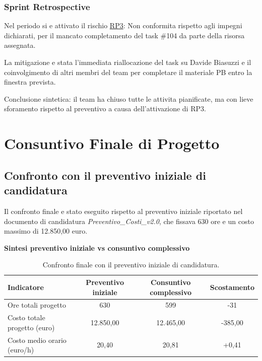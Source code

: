 \documentclass[a4paper, 11pt, oneside]{scrartcl} %
\begin{document}
\subsubsection*{Sprint Retrospective}

Nel periodo si e attivato il rischio \hyperref[sec:rp3]{RP3}: Non conformita rispetto agli impegni dichiarati, per il mancato completamento del task \#104 da parte della risorsa assegnata.

La mitigazione e stata l'immediata riallocazione del task su Davide Biasuzzi e il coinvolgimento di altri membri del team per completare il materiale PB entro la finestra prevista.

Conclusione sintetica: il team ha chiuso tutte le attivita pianificate, ma con lieve sforamento rispetto al preventivo a causa dell'attivazione di RP3.

\newpage

\section{Consuntivo Finale di Progetto}
\label{sec:consuntivo_finale_progetto}

\subsection{Confronto con il preventivo iniziale di candidatura}

Il confronto finale e stato eseguito rispetto al preventivo iniziale riportato nel documento di candidatura \textit{Preventivo\_Costi\_v2.0}, che fissava 630 ore e un costo massimo di 12.850,00 euro.

\begin{table}[!ht]
\centering
{\large \textbf{Sintesi preventivo iniziale vs consuntivo complessivo}} \\
\vspace{0.3cm}
\renewcommand{\arraystretch}{1.4}
\begin{tabular}{|l|c|c|c|}
\hline
\textbf{Indicatore} & \textbf{Preventivo iniziale} & \textbf{Consuntivo complessivo} & \textbf{Scostamento} \\
\hline
Ore totali progetto & 630 & 599 & -31 \\
Costo totale progetto (euro) & 12.850,00 & 12.465,00 & -385,00 \\
Costo medio orario (euro/h) & 20,40 & 20,81 & +0,41 \\
\hline
\end{tabular}
\caption{Confronto finale con il preventivo iniziale di candidatura.}
\label{tab:consuntivo_vs_candidatura}
\end{table}
\FloatBarrier
\end{document}
